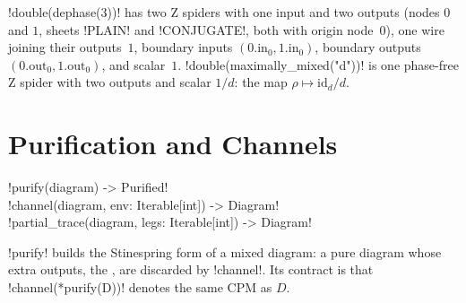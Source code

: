 \begin{example}
\py!double(dephase(3))! has two Z spiders with one input and two outputs (nodes $0$ and $1$, sheets \code!PLAIN! and \code!CONJUGATE!, both with origin node~$0$), one wire joining their outputs~$1$, boundary inputs $(0.\mathrm{in}_0, 1.\mathrm{in}_0)$, boundary outputs $(0.\mathrm{out}_0, 1.\mathrm{out}_0)$, and scalar~$1$. \py!double(maximally_mixed("d"))! is one phase-free Z spider with two outputs and scalar $1/d$: the map $\rho\mapsto\mathrm{id}_d/d$.
\end{example}

\section{Purification and Channels}\label{sec:mixed-purify}

\begin{signature}
\py!purify(diagram) -> Purified!\\
\py!channel(diagram, env: Iterable[int]) -> Diagram!\\
\py!partial_trace(diagram, legs: Iterable[int]) -> Diagram!
\end{signature}

\py!purify! builds the Stinespring form of a mixed diagram: a pure diagram whose extra outputs, the , are discarded by \py!channel!. Its contract is that \py!channel(*purify(D))! denotes the same CPM as $D$.

